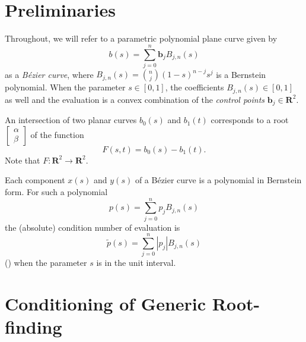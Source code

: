 \documentclass[3p, authoryear, square]{elsarticle}
\theoremstyle{definition}
\newcommand{\reals}{\mathbf{R}}
\begin{document}
\section{Preliminaries}

Throughout, we will refer to a parametric polynomial
plane curve given by
\begin{equation}
b(s) = \sum_{j = 0}^n \bm{b}_j B_{j, n}(s)
\end{equation}
as a \emph{B\'{e}zier curve},
where \(B_{j, n}(s) = \binom{n}{j} (1 - s)^{n - j} s^j\) is a Bernstein
polynomial.
When the parameter \(s \in \left[0, 1\right]\), the coefficients
\(B_{j, n}(s) \in \left[0, 1\right]\) as well and the evaluation is a convex
combination of the \emph{control points} \(\bm{b}_j \in \reals^2\).

An intersection of two planar curves \(b_0(s)\) and \(b_1(t)\) corresponds to
a root \(\left[\begin{array}{c}
\alpha \\ \beta \end{array}\right]\) of the function
\begin{equation}
F(s, t) = b_0(s) - b_1(t).
\end{equation}
Note that
\(F: \reals^2 \longrightarrow \reals^2\).

Each component \(x(s)\) and \(y(s)\) of a B\'{e}zier curve is a
polynomial in Bernstein form. For such a polynomial
\begin{equation}
p(s) = \sum_{j = 0}^n p_j B_{j, n}(s)
\end{equation}
the (absolute) condition number of evaluation is
\begin{equation}\label{eq:p-tilde}
\widetilde{p}(s) = \sum_{j = 0}^n \left|p_j\right| B_{j, n}(s)
\end{equation}
(\cite{Farouki1987}) when the parameter \(s\) is in the unit interval.

\section{Conditioning of Generic Root-finding}\label{sec:generic}
\end{document}
